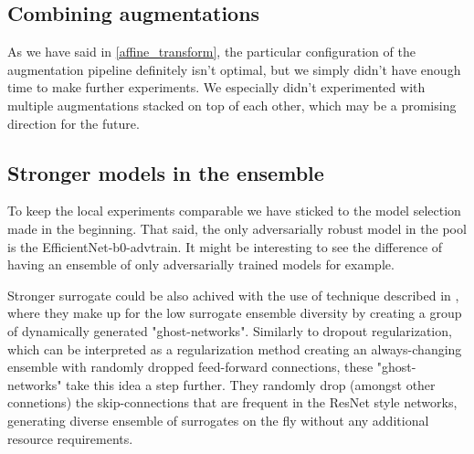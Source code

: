 \subsection{Combining augmentations}
As we have said in \ref{affine_transform}, the particular configuration of the augmentation pipeline definitely isn't optimal, but we simply didn't have enough time to make further experiments. We especially didn't experimented with multiple augmentations stacked on top of each other, which may be a promising direction for the future.

\subsection{Stronger models in the ensemble}
To keep the local experiments comparable we have sticked to the model selection made in the beginning. That said, the only adversarially robust model in the pool is the EfficientNet-b0-advtrain. It might be interesting to see the difference of having an ensemble of only adversarially trained models for example.

Stronger surrogate could be also achived with the use of technique described in \cite{li2019learning}, where they make up for the low surrogate ensemble diversity by creating a group of dynamically generated "ghost-networks". Similarly to dropout regularization, which can be interpreted as a regularization method creating an always-changing ensemble with randomly dropped feed-forward connections, these "ghost-networks" take this idea a step further. They randomly drop (amongst other connetions) the skip-connections that are frequent in the ResNet style networks, generating diverse ensemble of surrogates on the fly without any additional resource requirements.